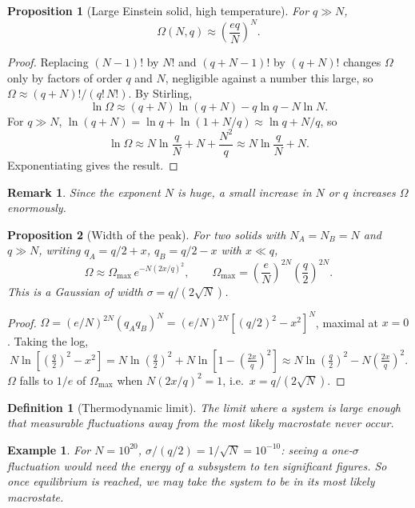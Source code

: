 \documentclass{article}
\newtheorem{definition}{Definition}
\newtheorem*{example}{Example}
\newtheorem{remark}{Remark}
\newtheorem{proposition}{Proposition}
\begin{document}
\begin{proposition}[Large Einstein solid, high temperature]
    For $q \gg N$,
    \[\Omega(N, q) \approx \left(\frac{eq}{N}\right)^N.\]
\end{proposition}
\begin{proof}
    Replacing $(N-1)!$ by $N!$ and $(q+N-1)!$ by $(q+N)!$ changes $\Omega$ only by factors of order $q$ and $N$, negligible against a number this large, so $\Omega \approx (q+N)!/(q!\,N!)$. By Stirling,
    \[\ln\Omega \approx (q+N)\ln(q+N) - q\ln q - N\ln N.\]
    For $q \gg N$, $\ln(q+N) = \ln q + \ln(1 + N/q) \approx \ln q + N/q$, so
    \[\ln\Omega \approx N \ln\frac{q}{N} + N + \frac{N^2}{q} \approx N\ln\frac{q}{N} + N.\]
    Exponentiating gives the result.
\end{proof}
\begin{remark}
    Since the exponent $N$ is huge, a small increase in $N$ or $q$ increases $\Omega$ enormously.
\end{remark}

\begin{proposition}[Width of the peak]
    For two solids with $N_A = N_B = N$ and $q \gg N$, writing $q_A = q/2 + x$, $q_B = q/2 - x$ with $x \ll q$,
    \[\Omega \approx \Omega_{\max}\,e^{-N(2x/q)^2}, \qquad \Omega_{\max} = \left(\frac{e}{N}\right)^{2N}\left(\frac{q}{2}\right)^{2N}.\]
    This is a Gaussian of width $\sigma = q/(2\sqrt{N})$.
\end{proposition}
\begin{proof}
    $\Omega = (e/N)^{2N}(q_A q_B)^N = (e/N)^{2N}\left[(q/2)^2 - x^2\right]^N$, maximal at $x = 0$. Taking the log,
    \[N\ln\left[\left(\tfrac{q}{2}\right)^2 - x^2\right] = N\ln\left(\tfrac{q}{2}\right)^2 + N\ln\left[1 - \left(\tfrac{2x}{q}\right)^2\right] \approx N\ln\left(\tfrac{q}{2}\right)^2 - N\left(\tfrac{2x}{q}\right)^2.\]
    $\Omega$ falls to $1/e$ of $\Omega_{\max}$ when $N(2x/q)^2 = 1$, i.e.\ $x = q/(2\sqrt{N})$.
\end{proof}

\begin{definition}[Thermodynamic limit]
    The limit where a system is large enough that measurable fluctuations away from the most likely macrostate never occur.
\end{definition}
\begin{example}
    For $N = 10^{20}$, $\sigma/(q/2) = 1/\sqrt{N} = 10^{-10}$: seeing a one-$\sigma$ fluctuation would need the energy of a subsystem to ten significant figures. So once equilibrium is reached, we may take the system to be in its most likely macrostate.
\end{example}
\end{document}
